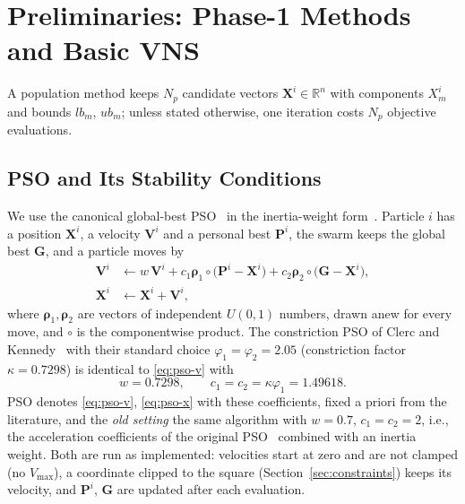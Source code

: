 \section{Preliminaries: Phase-1 Methods and Basic VNS}
\label{sec:prelim}
\makeatletter{}\makeatother
A population method keeps $N_p$ candidate vectors $\mathbf X^i\in\mathbb R^{n}$ with components $X^i_m$ and bounds $lb_m$, $ub_m$; unless stated otherwise, one iteration costs $N_p$ objective evaluations.

\subsection{PSO and Its Stability Conditions}
\label{sec:pso}
We use the canonical global-best PSO~\cite{Kennedy1995} in the inertia-weight form~\cite{Shi1998}. Particle $i$ has a position $\mathbf X^i$, a velocity $\mathbf V^i$ and a personal best $\mathbf P^i$, the swarm keeps the global best $\mathbf G$, and a particle moves by
\begin{align}
\mathbf V^i&\leftarrow w\,\mathbf V^i+c_1\boldsymbol\rho_1\circ\bigl(\mathbf P^i-\mathbf X^i\bigr)+c_2\boldsymbol\rho_2\circ\bigl(\mathbf G-\mathbf X^i\bigr),\label{eq:pso-v}\\
\mathbf X^i&\leftarrow\mathbf X^i+\mathbf V^i,\label{eq:pso-x}
\end{align}
where $\boldsymbol\rho_1,\boldsymbol\rho_2$ are vectors of independent $U(0,1)$ numbers, drawn anew for every move, and $\circ$ is the componentwise product. The constriction PSO of Clerc and Kennedy~\cite{Clerc2002} with their standard choice $\varphi_1=\varphi_2=2.05$ (constriction factor $\kappa=0.7298$) is identical to \eqref{eq:pso-v} with
\begin{equation}
w=0.7298,\qquad c_1=c_2=\kappa\varphi_1=1.49618 .
\label{eq:constriction}
\end{equation}
PSO denotes \eqref{eq:pso-v}, \eqref{eq:pso-x} with these coefficients, fixed a priori from the literature, and the \emph{old setting} the same algorithm with $w=0.7$, $c_1=c_2=2$, i.e., the acceleration coefficients of the original PSO~\cite{Kennedy1995} combined with an inertia weight. Both are run as implemented: velocities start at zero and are not clamped (no $V_{\max}$), a coordinate clipped to the square (Section~\ref{sec:constraints}) keeps its velocity, and $\mathbf P^i$, $\mathbf G$ are updated after each evaluation.

